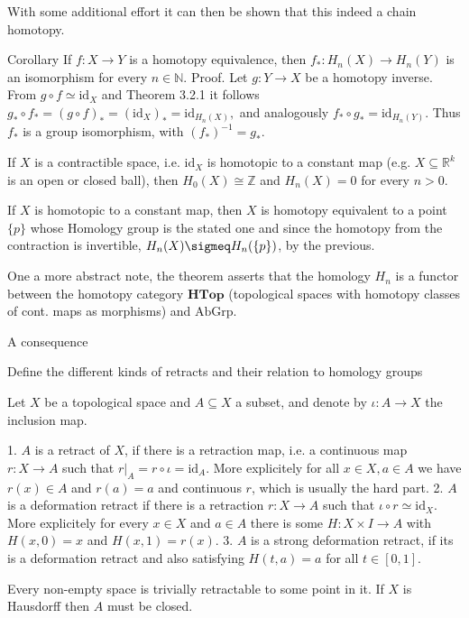 With some additional effort it can then be shown that this indeed a chain homotopy.

Corollary
If \(f: X \to Y\) is a homotopy equivalence, then \(f_*: H_n(X) \to H_n(Y)\) is an isomorphism for every \(n \in \mathbb{N}\).
Proof. Let \(g: Y \to X\) be a homotopy inverse. From \(g \circ f \simeq \text{id}_X\) and Theorem 3.2.1 it follows
\(g_* \circ f_* = (g \circ f)_* = (\text{id}_X)_* = \text{id}_{H_n(X)},\)
and analogously \(f_* \circ g_* = \text{id}_{H_n(Y)}\). Thus \(f_*\) is a group isomorphism, with \((f_*)^{-1} = g_*\).

If \(X\) is a contractible space, i.e. \(\text{id}_X\) is homotopic to a constant map (e.g. \(X \subseteq \mathbb{R}^k\) is an open or closed ball), then \(H_0(X) \cong \mathbb{Z}\) and \(H_n(X) = 0\) for every \(n > 0\).

If \(X\) is homotopic to a constant map, then \(X\) is homotopy equivalent to a point \(\{p\}\) whose Homology group is the stated one and since the homotopy
from the contraction is invertible, \( H_n(X) \sigmeq H_n(\{p\})\), by the previous.

One a more abstract note, the theorem asserts that the homology \( H_n \) is a functor between the homotopy category \( \textbf{HTop} \) 
(topological spaces with homotopy classes of cont. maps as morphisms) and \( \text{AbGrp} \).

A consequence

Define the different kinds of retracts and their relation to homology groups

Let \(X\) be a topological space and \(A \subseteq X\) a subset, and denote by \(\iota : A \to X\) the inclusion map. 

1. \(A\) is a retract of \(X\), if there is a retraction map, i.e. a continuous map \(r: X \to A\) such that \(r|_A = r \circ \iota = \text{id}_A\).
More explicitely for all \( x \in X, a \in A\) we have \( r(x) \in A \) and \( r(a) = a \) and continuous \( r \), which is usually the hard part.
2. \(A\) is a deformation retract if there is a retraction \(r: X \to A\) such that \(\iota \circ r \simeq \text{id}_X\).
More explicitely for every \( x \in X \) and \( a \in A \) there is some \( H : X \times I \to A \) with \( H(x, 0) = x \) and \( H(x, 1) = r(x) \).
3. \(A\) is a strong deformation retract, if its is a deformation retract and also satisfying \( H(t, a) = a \) for all \( t \in [0, 1] \).

Every non-empty space is trivially retractable to some point in it.
If \( X \) is Hausdorff then \( A \) must be closed.

